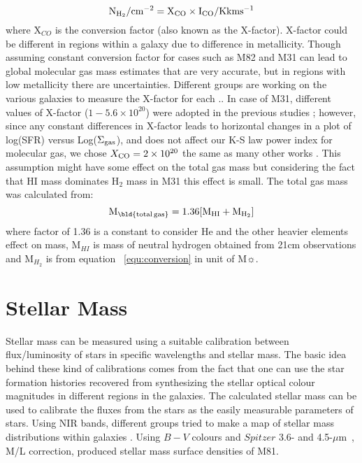 \documentclass[useAMS,usenatbib]{mn2e}
\newcommand \um    {$\mu$m\ }
\begin{document}
\begin{equation}
\label{equ:conversion}
\rm N_{H_2}/\rm cm^{-2} = X_{CO} \times I_{CO}/\rm K km s^{-1}
\end{equation}
where X$_{CO}$ is the conversion factor (also known as the X-factor). X-factor could be different in regions within a galaxy due to difference in metallicity. Though assuming constant conversion factor for cases such as M82 and M31 can lead to global molecular gas mass estimates that are very accurate,  but in regions with low metallicity there are uncertainties. Different groups are working on the various galaxies to measure the X-factor for each \citep{Wilson95, Bosselli02, Bolato13}.. In case of M31, different values of X-factor ($1-5.6 \times 10^{20}$) were adopted in the previous studies \citep[e.g.][]{Ford13, Bolato13, Leroy11, Bolato08, Nieten06, Sofue94, Strong88}; however, since any constant differences in X-factor leads to horizontal changes in a plot of log(SFR) versus Log($\Sigma_{\rm {gas}}$), and does not affect our K-S law power index for molecular gas,  we chose $X_{\rm {CO}}= 2 \times 10^{20}$  the same as many other works \citep[e.g.][]{Ford13, Smith12}. This assumption might have some effect on the total gas mass but considering the fact that HI mass dominates H$_2$ mass in M31 this effect is small.
The total gas mass was calculated from:
\begin{equation}
\label{equ:total_gas}
\rm M_{\rm \bld {total \, gas}} = 1.36[M_{HI}+M_{H_2}]
\end{equation}
where  factor of 1.36 is a constant to consider He and the other heavier elements effect on mass, M$_{HI}$ is mass of neutral hydrogen obtained from 21cm observations and M$_{H_2}$ is from equation ~\ref{equ:conversion} in unit of M$\sun$.

\section{Stellar Mass}
\label{starmass}
Stellar mass can be measured using a suitable calibration between flux/luminosity of stars in specific wavelengths and stellar mass. The basic idea behind these kind of calibrations comes from the fact that one can use the star formation histories recovered from synthesizing the stellar optical colour magnitudes in different regions in the galaxies. The calculated stellar mass can be used  to calibrate the fluxes from the stars as the easily measurable parameters of stars. Using NIR bands, different groups tried to make a map of stellar mass distributions within galaxies \citep[e.g.,][]{Elmgreen84}.  Using $B-V$ colours \citep{Bell01} and $Spitzer$ 3.6- and 4.5-\um, M/L correction, \cite{Kendall08} produced stellar mass surface densities of M81. %
\end{document}
